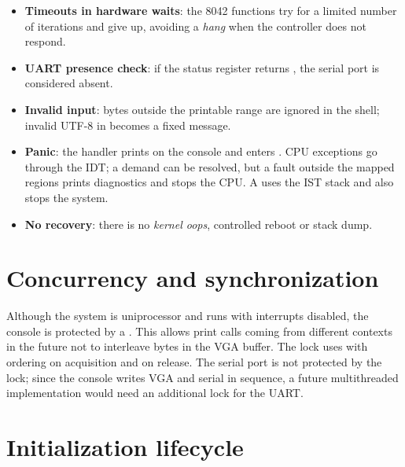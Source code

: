 \begin{itemize}
  \item \textbf{Timeouts in hardware waits}: the 8042 functions
        try for a limited number of iterations and give up, avoiding a
        \emph{hang} when the controller does not respond.
  \item \textbf{UART presence check}: if the status register
        returns , the serial port is considered absent.
  \item \textbf{Invalid input}: bytes outside the printable range are
        ignored in the shell; invalid UTF-8 in  becomes a
        fixed message.
  \item \textbf{Panic}: the handler prints \code{[PANIC]} on the console and enters
        . CPU exceptions go through the IDT; a
        demand  can be resolved, but a fault outside the
        mapped regions prints diagnostics and stops the CPU. A
         uses the IST stack and also stops the system.
  \item \textbf{No recovery}: there is no \emph{kernel oops},
        controlled reboot or stack dump.
\end{itemize}

\section{Concurrency and synchronization}

Although the system is uniprocessor and runs with interrupts
disabled, the console is protected by a . This allows
print calls coming from different contexts in the future not to
interleave bytes in the VGA buffer. The lock uses  with
 ordering on acquisition and  on
release. The serial port is not protected by the lock; since the console
writes VGA and serial in sequence, a future multithreaded implementation
would need an additional lock for the UART.

\section{Initialization lifecycle}

